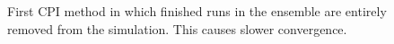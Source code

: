 \documentclass[11pt]{article}
\begin{document}
\begin{figure}[h!]
  \centering
  \hspace{3mm}
  \caption{First CPI method in which finished runs in the ensemble are entirely removed from the simulation. This causes slower convergence.}
  \label{fig:vmSlow}
\end{figure}
\end{document}
